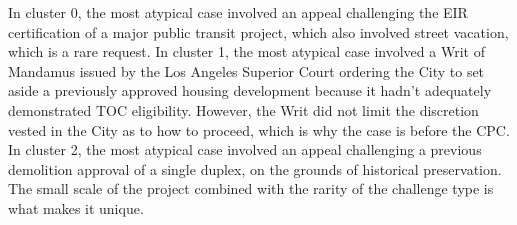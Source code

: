 In cluster 0, the most atypical case involved an appeal challenging the EIR certification of a major public transit project, which also involved street vacation, which is a rare request. 
In cluster 1, the most atypical case involved a Writ of Mandamus issued by the Los Angeles Superior Court ordering the City to set aside a previously approved housing development because it hadn't adequately demonstrated TOC eligibility. However, the Writ did not limit the discretion vested in the City as to how to proceed, which is why the case is before the CPC.
In cluster 2, the most atypical case involved an appeal challenging a previous demolition approval of a single duplex, on the grounds of historical preservation. The small scale of the project combined with the rarity of the challenge type is what makes it unique.